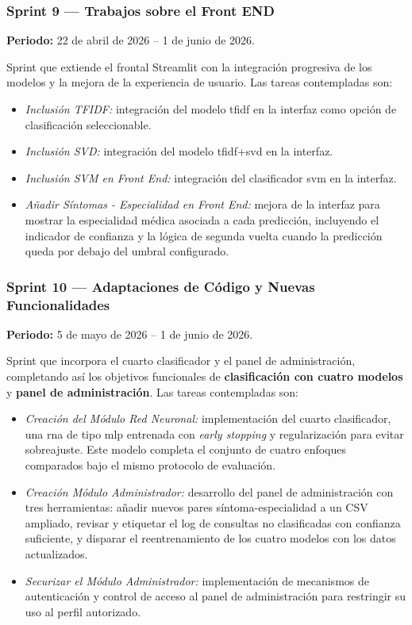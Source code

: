 \subsubsection*{Sprint 9 --- Trabajos sobre el Front END}

\textbf{Periodo:} 22 de abril de 2026 -- 1 de junio de 2026.

Sprint que extiende el frontal Streamlit \cite{streamlit_docs} con la integración progresiva de los modelos y la mejora de la experiencia de usuario. Las tareas contempladas son:

\begin{itemize}
	\item \textit{Inclusión TFIDF:} integración del modelo \gls{tfidf} en la interfaz como opción de clasificación seleccionable.
	\item \textit{Inclusión SVD:} integración del modelo \gls{tfidf}+\gls{svd} en la interfaz.
	\item \textit{Inclusión SVM en Front End:} integración del clasificador \gls{svm} en la interfaz.
	\item \textit{Añadir Síntomas - Especialidad en Front End:} mejora de la interfaz para mostrar la especialidad médica asociada a cada predicción, incluyendo el indicador de confianza y la lógica de segunda vuelta cuando la predicción queda por debajo del umbral configurado.
\end{itemize}

\subsubsection*{Sprint 10 --- Adaptaciones de Código y Nuevas Funcionalidades}

\textbf{Periodo:} 5 de mayo de 2026 -- 1 de junio de 2026.

Sprint que incorpora el cuarto clasificador y el panel de administración, completando así los objetivos funcionales de \textbf{clasificación con cuatro modelos} y \textbf{panel de administración}. Las tareas contempladas son:

\begin{itemize}
	\item \textit{Creación del Módulo Red Neuronal:} implementación del cuarto clasificador, una \gls{rna} de tipo \gls{mlp} entrenada con \textit{early stopping} y regularización para evitar sobreajuste. Este modelo completa el conjunto de cuatro enfoques comparados bajo el mismo protocolo de evaluación.
	\item \textit{Creación Módulo Administrador:} desarrollo del panel de administración con tres herramientas: añadir nuevos pares síntoma-especialidad a un CSV ampliado, revisar y etiquetar el log de consultas no clasificadas con confianza suficiente, y disparar el reentrenamiento de los cuatro modelos con los datos actualizados.
	\item \textit{Securizar el Módulo Administrador:} implementación de mecanismos de autenticación y control de acceso al panel de administración para restringir su uso al perfil autorizado.
\end{itemize}

